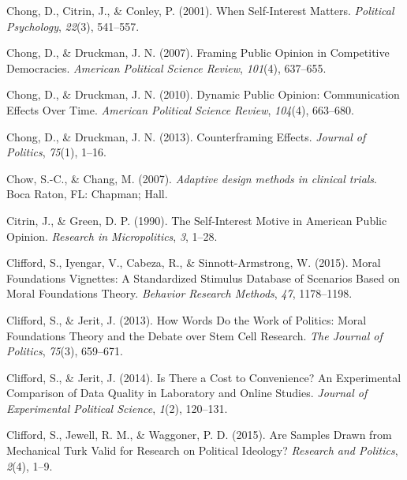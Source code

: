 \documentclass[12pt,econ]{sources/authesis}
\newenvironment{CSLReferences}%
  {}%
  {\par}
\begin{document}
\begin{CSLReferences}{1}{0}
\leavevmode{}%
Chong, D., Citrin, J., \& Conley, P. (2001). When {Self}-{Interest} {Matters}. \emph{Political Psychology}, \emph{22}(3), 541--557.

\leavevmode{}%
Chong, D., \& Druckman, J. N. (2007). Framing {Public} {Opinion} in {Competitive} {Democracies}. \emph{American Political Science Review}, \emph{101}(4), 637--655.

\leavevmode{}%
Chong, D., \& Druckman, J. N. (2010). Dynamic {Public} {Opinion}: {Communication} {Effects} {Over} {Time}. \emph{American Political Science Review}, \emph{104}(4), 663--680.

\leavevmode{}%
Chong, D., \& Druckman, J. N. (2013). Counterframing {Effects}. \emph{Journal of Politics}, \emph{75}(1), 1--16.

\leavevmode{}%
Chow, S.-C., \& Chang, M. (2007). \emph{Adaptive design methods in clinical trials}. Boca Raton, FL: Chapman; Hall.

\leavevmode{}%
Citrin, J., \& Green, D. P. (1990). {The Self-Interest Motive in American Public Opinion}. \emph{Research in Micropolitics}, \emph{3}, 1--28.

\leavevmode{}%
Clifford, S., Iyengar, V., Cabeza, R., \& Sinnott-Armstrong, W. (2015). {Moral Foundations Vignettes: A Standardized Stimulus Database of Scenarios Based on Moral Foundations Theory}. \emph{Behavior Research Methods}, \emph{47}, 1178--1198.

\leavevmode{}%
Clifford, S., \& Jerit, J. (2013). {How Words Do the Work of Politics: Moral Foundations Theory and the Debate over Stem Cell Research}. \emph{The Journal of Politics}, \emph{75}(3), 659--671.

\leavevmode{}%
Clifford, S., \& Jerit, J. (2014). {Is There a Cost to Convenience? An Experimental Comparison of Data Quality in Laboratory and Online Studies}. \emph{Journal of Experimental Political Science}, \emph{1}(2), 120--131.

\leavevmode{}%
Clifford, S., Jewell, R. M., \& Waggoner, P. D. (2015). {Are Samples Drawn from Mechanical Turk Valid for Research on Political Ideology?} \emph{Research and Politics}, \emph{2}(4), 1--9.


\end{CSLReferences}
\end{document}
